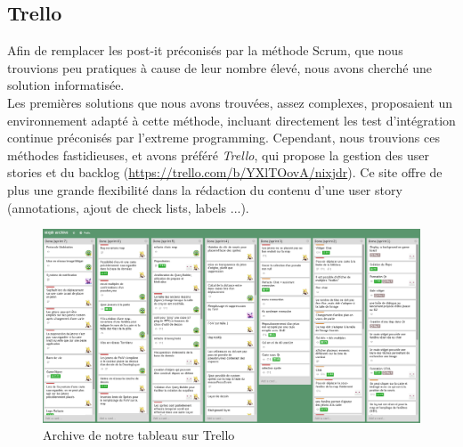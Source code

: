 \subsection{Trello}

Afin de remplacer les post-it préconisés par la méthode Scrum, que nous trouvions peu pratiques à cause de leur nombre élevé, nous avons cherché une solution informatisée. \\

Les premières solutions que nous avons trouvées, assez complexes, proposaient un environnement adapté à cette méthode, incluant directement les test d'intégration continue préconisés par l'extreme programming. Cependant, nous trouvions ces méthodes fastidieuses, et avons préféré \textit{Trello}, qui propose la gestion des user stories et du backlog (\href{https://trello.com/b/YXlTOovA/nixjdr}{https://trello.com/b/YXlTOovA/nixjdr}).
Ce site offre de plus une grande flexibilité dans la rédaction du contenu d'une user story (annotations, ajout de check lists, labels ...).

\begin{figure}[h!]
	\centering
	\includegraphics[width=\textwidth]{img/trello_archive.png}
	\caption{Archive de notre tableau sur Trello}
	\label{fig:trello}
\end{figure}
